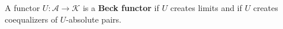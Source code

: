 A functor $U: \mathcal{A} \rightarrow \mathcal{K}$ is a \textbf{Beck functor} if $U$ creates limits and if $U$ creates coequalizers of $U$-absolute pairs.
